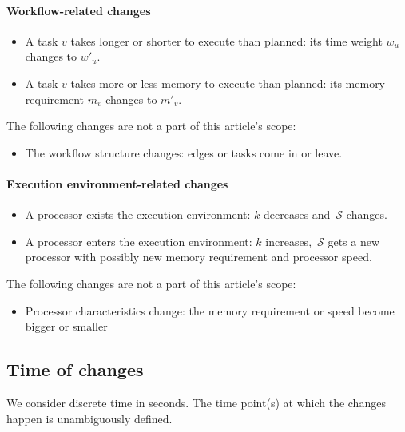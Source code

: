 \documentclass[sigconf,review,anonymous]{acmart}
\newcommand{\cluster}{\,\mathcal{S}}
\begin{document}
    \paragraph{Workflow-related changes}

    \begin{itemize}
        \item A task $v$ takes longer or shorter to execute than planned: its time weight $w_u$ changes to $w'_u$.
        \item A task $v$ takes more or less memory to execute than planned: its memory requirement $m_v$ changes to $m'_v$.

    \end{itemize}

    The following changes are not a part of this article's scope:

    \begin{itemize}
        \item The workflow structure changes: edges or tasks come in or leave.
    \end{itemize}

    \paragraph{Execution environment-related changes }


    \begin{itemize}
        \item A processor exists the execution environment: $k$ decreases and $\cluster$ changes.
        \item A processor enters the execution environment: $k$ increases, $\cluster$ gets a new processor with possibly new memory requirement and processor speed.

    \end{itemize}

    The following changes are not a part of this article's scope:

    \begin{itemize}
        \item Processor characteristics change: the memory requirement or speed become bigger or smaller
    \end{itemize}

    \subsection{Time of changes }

    We consider discrete time in seconds.
    The time point(s) at which the changes happen is unambiguously defined.
\end{document}
